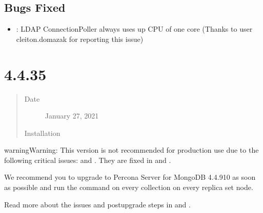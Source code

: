 \documentclass[letterpaper,10pt,english]{sphinxmanual}
\begin{document}
\subsection{Bugs Fixed}
\label{\detokenize{release_notes/4.4.4-6:bugs-fixed}}\begin{itemize}
\item {} 
\sphinxAtStartPar
{}: LDAP ConnectionPoller always uses up CPU of one core (Thanks to user cleiton.domazak for reporting this issue)

\end{itemize}


\section{ 4.4.3\sphinxhyphen{}5}
\label{\detokenize{release_notes/4.4.3-5:percona-server-for-mongodb-4-4-3-5}}\label{\detokenize{release_notes/4.4.3-5:psmdb-4-4-3-5}}\label{\detokenize{release_notes/4.4.3-5::doc}}\begin{quote}\begin{description}
\item[{Date}] \leavevmode
\sphinxAtStartPar
January 27, 2021

\item[{Installation}] \leavevmode
\sphinxAtStartPar
{}

\end{description}\end{quote}

\begin{sphinxadmonition}{warning}{Warning:}
\sphinxAtStartPar
This version is not recommended for production use due to the following critical issues:  and . They are fixed in  and {\hyperref[\detokenize{release_notes/4.4.9-10:psmdb-4-4-9-10}]{}}.

\sphinxAtStartPar
We recommend you to upgrade to Percona Server for MongoDB 4.4.9\sphinxhyphen{}10 as soon as possible and run the  command on every collection on every replica set node.

\sphinxAtStartPar
Read more about the issues and post\sphinxhyphen{}upgrade steps in  and .
\end{sphinxadmonition}
\end{document}
